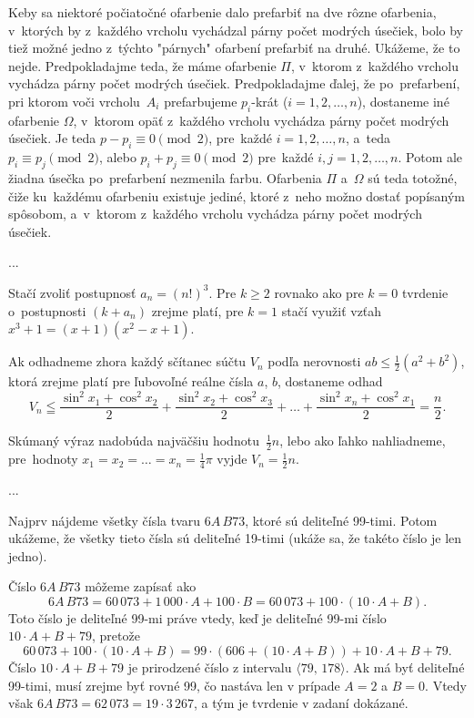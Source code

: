 {Keby sa niektoré počiatočné ofarbenie dalo prefarbiť na dve rôzne
ofarbenia, v~ktorých by z~každého vrcholu vychádzal párny počet
modrých úsečiek, bolo by tiež možné jedno z~týchto "párnych"
ofarbení prefarbiť na druhé. Ukážeme, že to nejde. Predpokladajme
teda, že máme ofarbenie $\varPi$, v~ktorom z~každého vrcholu
vychádza párny počet modrých úsečiek. Predpokladajme ďalej, že
po~prefarbení, pri ktorom voči vrcholu~$A_i$ prefarbujeme $p_i$-krát
($i=1,2,\ldots,n$), dostaneme iné ofarbenie $\varOmega$, v~ktorom
opäť z~každého vrcholu vychádza párny počet modrých úsečiek. Je teda
$p-p_i\equiv 0\pmod 2$, pre~každé $i=1,2,\ldots,n$, a~teda
$p_i\equiv p_j\pmod 2$, alebo $p_i+p_j\equiv 0\pmod 2$ pre~každé
$i,j=1,2,\ldots,n$. Potom ale žiadna úsečka po~prefarbení
nezmenila farbu. Ofarbenia $\varPi$ a~$\varOmega$ sú teda totožné,
čiže ku~každému ofarbeniu existuje jediné, ktoré z~neho
možno dostať popísaným spôsobom, a~v~ktorom z~každého vrcholu vychádza
párny počet modrých úsečiek.
}

{%
...}

{%
Stačí zvoliť postupnosť $a_n=(n!)^3$. Pre $k\ge 2$ rovnako ako
pre $k=0$ tvrdenie o~postupnosti $(k+a_n)$ zrejme
platí, pre $k=1$ stačí využiť vzťah $x^3+1=(x+1)(x^2-x+1)$.
}

{%
Ak odhadneme zhora každý sčítanec súčtu $V_n$ podľa
nerovnosti $ab\le\frac12(a^2+b^2)$, ktorá zrejme platí pre
ľubovoľné reálne čísla $a$, $b$, dostaneme odhad
$$
V_n\leqq\frac{\sin^2x_1+\cos^2x_2}{2}+
        \frac{\sin^2x_2+\cos^2x_3}{2}+\dots+
        \frac{\sin^2x_n+\cos^2x_1}{2}=\frac{n}{2}.
$$

Skúmaný výraz nadobúda najväčšiu hodnotu~$\frac12 n$, lebo ako
ľahko nahliadneme, pre~hod\-no\-ty $x_1=x_2=\dots=x_n=\frac14\pi$ vyjde
$V_n=\frac12n$.
}

{%
...}

{%
Najprv nájdeme všetky čísla tvaru $6A\,B73$, ktoré sú deliteľné 99-timi.
Potom uká\-že\-me, že všetky tieto čísla sú deliteľné 19-timi
(ukáže sa, že takéto číslo je len jedno).

Číslo $6A\,B73$ môžeme zapísať ako
$$6A\,B73 = 60\,073+1\,000\cdot A+100\cdot B =
60\,073+100\cdot (10\cdot A+B).$$
Toto číslo je deliteľné 99-mi práve
vtedy, keď je deliteľné 99-mi číslo $10\cdot A + B + 79$, pretože
$$60\,073+100\cdot (10\cdot A+B) =
99\cdot (606 + (10\cdot A + B)) + 10\cdot A + B + 79 .$$
Číslo $10\cdot A + B + 79$ je prirodzené číslo z intervalu
$\langle 79,\, 178 \rangle$. Ak má byť deliteľné 99-timi, musí zrejme byť
rovné 99, čo nastáva len v prípade $A=2$ a $B=0$. Vtedy však
$6A\,B73=62\,073 = 19\cdot 3\,267$, a tým je tvrdenie v zadaní dokázané.
}

